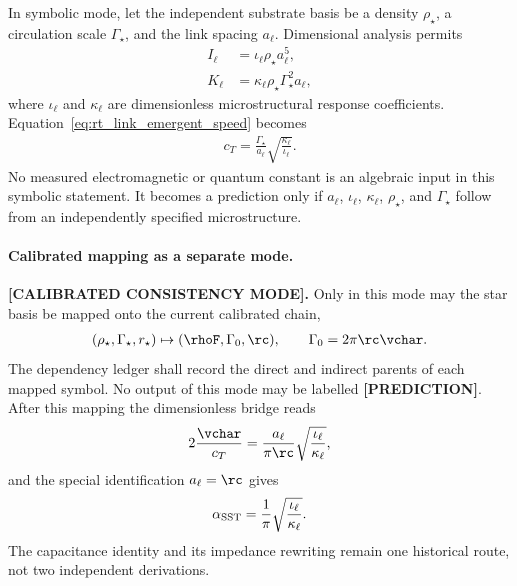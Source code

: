 In symbolic mode, let the independent substrate basis be a density
\(\rho_\star\), a circulation scale \(\Gamma_\star\), and the link spacing
\(a_\ell\).  Dimensional analysis permits
\begin{align}
    I_\ell
    &=
    \iota_\ell\rho_\star a_\ell^5,
    \\
    K_\ell
    &=
    \kappa_\ell\rho_\star\Gamma_\star^2a_\ell,
    \label{eq:rt_link_zero_legacy_coefficients}
\end{align}
where \(\iota_\ell\) and \(\kappa_\ell\) are dimensionless microstructural
response coefficients.  Equation~\eqref{eq:rt_link_emergent_speed} becomes
\begin{align}
    \boxed{
    c_T
    =
    \frac{\Gamma_\star}{a_\ell}
    \sqrt{\frac{\kappa_\ell}{\iota_\ell}}
    }.
    \label{eq:rt_link_zero_legacy_speed}
\end{align}
No measured electromagnetic or quantum constant is an algebraic input in this
symbolic statement.  It becomes a prediction only if \(a_\ell\),
\(\iota_\ell\), \(\kappa_\ell\), \(\rho_\star\), and \(\Gamma_\star\) follow
from an independently specified microstructure.

\paragraph{Calibrated mapping as a separate mode.}
\textbf{[CALIBRATED CONSISTENCY MODE].}
Only in this mode may the star basis be mapped onto the current calibrated chain,
\begin{align}
    (\rho_\star,\Gamma_\star,r_\star)
    \mapsto
    (\rhoF,\Gamma_0,\rc),
    \qquad
    \Gamma_0=2\pi\rc\vchar.
    \label{eq:rt_link_calibrated_star_mapping}
\end{align}
The dependency ledger shall record the direct and indirect parents of each
mapped symbol.  No output of this mode may be labelled \textbf{[PREDICTION]}.
After this mapping the dimensionless bridge reads
\begin{align}
    2\frac{\vchar}{c_T}
    =
    \frac{a_\ell}{\pi\rc}
    \sqrt{\frac{\iota_\ell}{\kappa_\ell}},
    \label{eq:rt_link_alpha_route}
\end{align}
and the special identification \(a_\ell=\rc\) gives
\begin{align}
    \alpha_{\rm SST}
    =
    \frac{1}{\pi}
    \sqrt{\frac{\iota_\ell}{\kappa_\ell}}.
    \label{eq:rt_link_alpha_response_ratio}
\end{align}
The capacitance identity and its impedance rewriting remain one historical
route, not two independent derivations.

